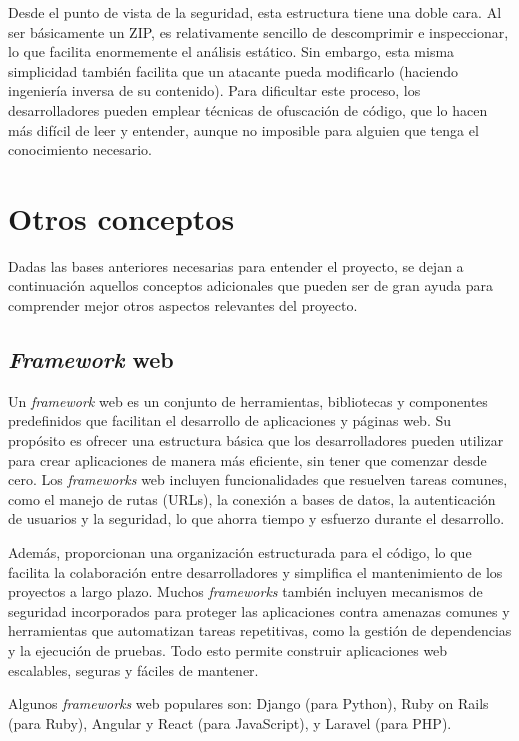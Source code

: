 Desde el punto de vista de la seguridad, esta estructura tiene una doble cara. Al ser básicamente un ZIP, es relativamente sencillo de descomprimir e inspeccionar, lo que facilita enormemente el análisis estático. Sin embargo, esta misma simplicidad también facilita que un atacante pueda modificarlo (haciendo ingeniería inversa de su contenido). Para dificultar este proceso, los desarrolladores pueden emplear técnicas de ofuscación de código, que lo hacen más difícil de leer y entender, aunque no imposible para alguien que tenga el conocimiento necesario.

\section{Otros conceptos}

Dadas las bases anteriores necesarias para entender el proyecto, se dejan a continuación aquellos conceptos adicionales que pueden ser de gran ayuda para comprender mejor otros aspectos relevantes del proyecto.

\subsection{\textit{Framework} web}

Un \textit{framework} web es un conjunto de herramientas, bibliotecas y componentes predefinidos que facilitan el desarrollo de aplicaciones y páginas web. Su propósito es ofrecer una estructura básica que los desarrolladores pueden utilizar para crear aplicaciones de manera más eficiente, sin tener que comenzar desde cero. Los \textit{frameworks} web incluyen funcionalidades que resuelven tareas comunes, como el manejo de rutas (URLs), la conexión a bases de datos, la autenticación de usuarios y la seguridad, lo que ahorra tiempo y esfuerzo durante el desarrollo.

Además, proporcionan una organización estructurada para el código, lo que facilita la colaboración entre desarrolladores y simplifica el mantenimiento de los proyectos a largo plazo. Muchos \textit{frameworks} también incluyen mecanismos de seguridad incorporados para proteger las aplicaciones contra amenazas comunes y herramientas que automatizan tareas repetitivas, como la gestión de dependencias y la ejecución de pruebas. Todo esto permite construir aplicaciones web escalables, seguras y fáciles de mantener.

Algunos \textit{frameworks} web populares son: Django (para Python), Ruby on Rails (para Ruby), Angular y React (para JavaScript), y Laravel (para PHP).
